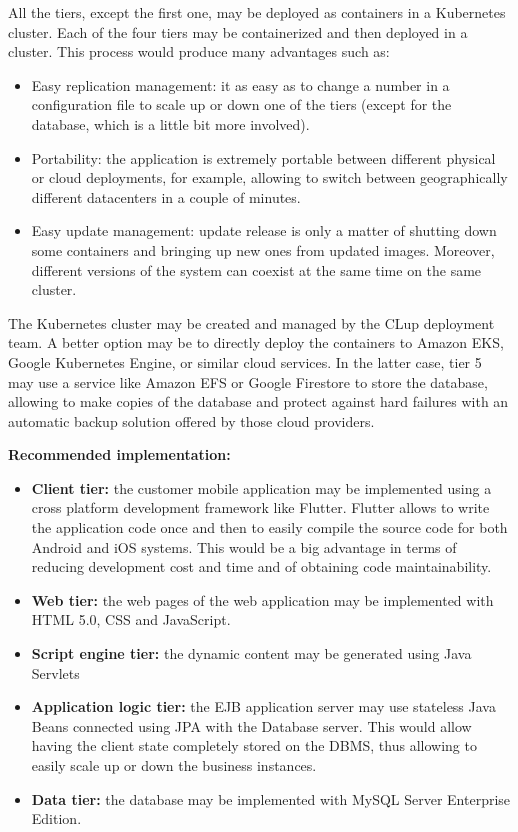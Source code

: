 All the tiers, except the first one, may be deployed as containers in a Kubernetes cluster. Each of the four tiers may be containerized and then deployed in a cluster. This process would produce many advantages such as:
\begin{itemize}
    \item Easy replication management: it as easy as to change a number in a configuration file to scale up or down one of the tiers (except for the database, which is a little bit more involved).
    \item Portability: the application is extremely portable between different physical or cloud deployments, for example, allowing to switch between geographically different datacenters in a couple of minutes.
    \item Easy update management: update release is only a matter of shutting down some containers and bringing up new ones from updated images. Moreover, different versions of the system can coexist at the same time on the same cluster.
\end{itemize}
The Kubernetes cluster may be created and managed by the CLup deployment team. A better option may be to directly deploy the containers to Amazon EKS, Google Kubernetes Engine, or similar cloud services. In the latter case, tier 5 may use a service like Amazon EFS or Google Firestore to store the database, allowing to make copies of the database and protect against hard failures with an automatic backup solution offered by those cloud providers.

\bigbreak
\textbf{Recommended implementation:}
\begin{itemize}
    \item \textbf{Client tier:} the customer mobile application may be implemented using a cross platform development framework like Flutter. Flutter allows to write the application code once and then to easily compile the source code for both Android and iOS systems. This would be a big advantage in terms of reducing development cost and time and of obtaining code maintainability. 
    \item \textbf{Web tier:} the web pages of the web application may be implemented with HTML 5.0, CSS and JavaScript. 
    \item \textbf{Script engine tier:} the dynamic content may be generated using Java Servlets
    \item \textbf{Application logic tier:} the EJB application server may use stateless Java Beans connected using JPA with the Database server. This would allow having the client state completely stored on the DBMS, thus allowing to easily scale up or down the business instances.
    \item \textbf{Data tier:} the database may be implemented with MySQL Server Enterprise Edition.
\end{itemize}